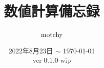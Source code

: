 \documentclass{ltjsreport}
\theoremstyle{definition}
\def\docVerMajor{0}
\def\docVerMinor{1}
\def\docVerPatch{0}
\def\docVerWip{-wip} %
\def\docVer{\docVerMajor.\docVerMinor.\docVerPatch\docVerWip}
\begin{document}
    \title{数値計算備忘録}
    \author{motchy}
    \date{ 2022年8月23日 $\sim$ \today \\ver \docVer}
	\maketitle

    \tableofcontents

    
\end{document}
